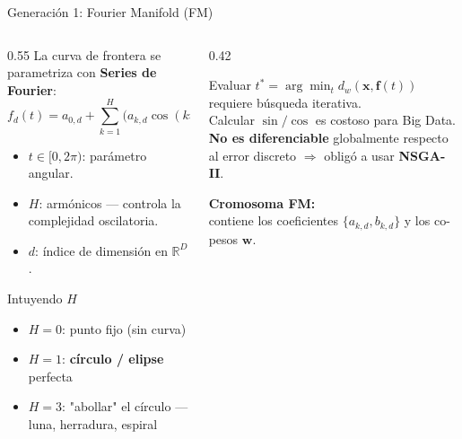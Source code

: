 \documentclass[aspectratio=169,10pt]{beamer}
\begin{document}
\begin{frame}{Generación 1: Fourier Manifold (FM)}
  \begin{columns}[T]
    \begin{column}{0.55\textwidth}
      La curva de frontera se parametriza con \textbf{Series de Fourier}:
      \begin{equation}
        f_d(t) = a_{0,d} + \sum_{k=1}^{H} \bigl( a_{k,d}\cos(kt) + b_{k,d}\sin(kt) \bigr)
      \end{equation}
      \begin{itemize}
        \item $t \in [0, 2\pi)$: parámetro angular.
        \item $H$: armónicos — controla la complejidad oscilatoria.
        \item $d$: índice de dimensión en $\mathbb{R}^D$.
      \end{itemize}
      \begin{alertblock}{Intuyendo $H$}
        \begin{itemize}
          \item $H=0$: punto fijo (sin curva)
          \item $H=1$: \textbf{círculo / elipse} perfecta
          \item $H=3$: "abollar" el círculo — luna, herradura, espiral
        \end{itemize}
      \end{alertblock}
    \end{column}
    \begin{column}{0.42\textwidth}
      \begin{tcolorbox}[mywarn={Limitación}]
        {\footnotesize Evaluar $t^* = \arg\min_t d_w(\mathbf{x}, \mathbf{f}(t))$ requiere búsqueda iterativa.\\[4pt]
        Calcular $\sin/\cos$ es costoso para Big Data.\\[4pt]
        \textbf{No es diferenciable} globalmente respecto al error discreto $\Rightarrow$ obligó a usar \textbf{NSGA-II}.}
      \end{tcolorbox}
      \vspace{6pt}
      {\small\textbf{Cromosoma FM:}\\contiene los coeficientes $\{a_{k,d}, b_{k,d}\}$ y los co-pesos $\mathbf{w}$.}
    \end{column}
  \end{columns}
\end{frame}
\end{document}
